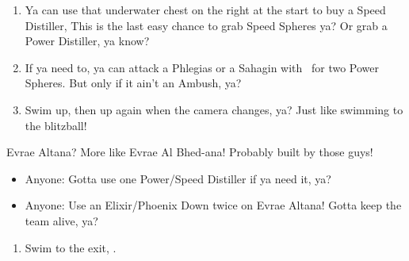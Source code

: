 \begin{enumerate}[resume]
\item Ya can use that underwater chest on the right at the start to buy a Speed Distiller, This is the last easy chance to grab Speed Spheres ya? Or grab a Power Distiller, ya know?
\item If ya need to, ya can attack a Phlegias or a Sahagin with \tidus\ for two Power Spheres. But only if it ain't an Ambush, ya?
\item Swim up, then up again when the camera changes, ya? Just like swimming to the blitzball!
\end{enumerate}
\begin{battle}{Evrae Altana? More like Evrae Al Bhed-ana! Probably built by those guys!}
\begin{itemize}
\item Anyone: Gotta use one Power/Speed Distiller if ya need it, ya?
\item Anyone: Use an Elixir/Phoenix Down twice on Evrae Altana! Gotta keep the team alive, ya?
\end{itemize}
\end{battle}
\begin{enumerate}[resume]
\item Swim to the exit, \sd.
\end{enumerate}
\bothnp\bothnpsingle